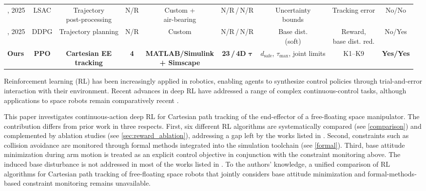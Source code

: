 \documentclass{ieeeaccess}
\begin{document}
\begin{table}[!t]
\begin{tabular}{lcccccccc}
		\cite{zhang2025learning}, 2025 & LSAC & \makecell{Trajectory\\post-processing} & N/R & \makecell{Custom +\\air-bearing} & N/R\,/\,N/R & \makecell{Uncertainty\\bounds} & Tracking error & No/No \\
		\cite{wei2025trajectory}, 2025 & DDPG & Trajectory planning & N/R & Custom & N/R\,/\,N/R & \makecell{Base dist.\\(soft)} & \makecell{Reward,\\base dist. red.} & No/Yes \\
		\midrule
		\textbf{Ours} & \textbf{PPO} & \makecell{\textbf{Cartesian EE}\\\textbf{tracking}} & \textbf{4} & \makecell{\textbf{MATLAB/Simulink}\\\textbf{+ Simscape}} & \textbf{23\,/\,4D} $\boldsymbol{\tau}$ & \makecell{$d_\text{safe}$, $\tau_\text{max}$,\\joint limits} & K1--K9 & \textbf{Yes/Yes} \\
		\bottomrule
	\end{tabular}
\end{table}

Reinforcement learning (RL) has been increasingly applied in robotics, enabling agents to
synthesize control policies through trial-and-error interaction with their environment. Recent advances in deep RL have addressed a range of complex continuous-control tasks, although applications to space robots remain comparatively recent \cite{wu2020reinforcement,al2024path,hu2025deep,zhang2025learning,huang2023obstacle}.

This paper investigates continuous-action deep RL for Cartesian path tracking of the end-effector of a free-floating space
manipulator. The contribution differs from prior work in three respects. First, six different RL algorithms are systematically compared (see \cref{comparison}) and complemented by ablation studies (see \cref{sec:reward_ablation}), addressing a gap left by the works listed in . Second, constraints such as collision avoidance are monitored
through formal methods integrated into the simulation toolchain (see \cref{formal}). Third, base attitude minimization during arm motion is treated as an explicit control objective in conjunction with the constraint monitoring above. The induced base disturbance is not addressed in most of the works listed in . To the authors' knowledge, a unified comparison of RL algorithms
for Cartesian path tracking of free-floating space robots that jointly considers base attitude minimization and formal-methods-based constraint monitoring remains unavailable.
\end{document}
